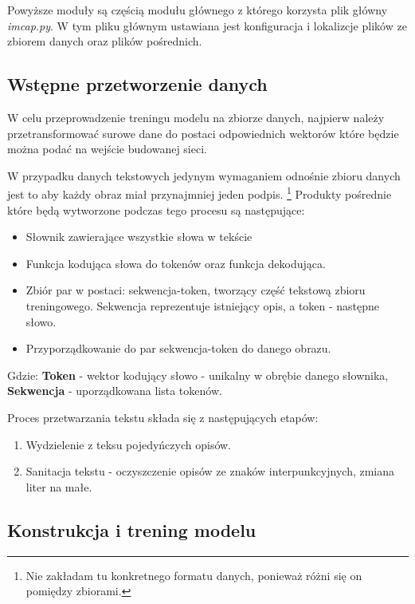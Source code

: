 Powyższe moduły są częścią modułu głównego z którego korzysta plik główny \textit{imcap.py}. W tym pliku głównym ustawiana jest konfiguracja i lokalizcje plików ze zbiorem danych oraz plików pośrednich.
\subsection{Wstępne przetworzenie danych}
W celu przeprowadzenie treningu modelu na zbiorze danych, najpierw należy przetransformować surowe dane do postaci odpowiednich wektorów które będzie można podać na wejście budowanej sieci.

W przypadku danych tekstowych jedynym wymaganiem odnośnie zbioru danych jest to aby każdy obraz miał przynajmniej jeden podpis.
\footnote{Nie zakładam tu konkretnego formatu danych, ponieważ różni się on pomiędzy zbiorami.} Produkty pośrednie które będą wytworzone podczas tego procesu są następujące:
\begin{itemize}
  \item Słownik zawierające wszystkie słowa w tekście
  \item Funkcja kodująca słowa do tokenów oraz funkcja dekodująca.
  \item Zbiór par w postaci: sekwencja-token, tworzący część tekstową zbioru treningowego. Sekwencja reprezentuje istniejący opis, a token - następne słowo.
  \item Przyporządkowanie do par sekwencja-token do danego obrazu.
\end{itemize} 
Gdzie: \textbf{Token} - wektor kodujący słowo - unikalny w obrębie danego słownika,
\textbf{Sekwencja} - uporządkowana lista tokenów.

Proces przetwarzania tekstu składa się z następujących etapów:
\begin{enumerate}
	\item Wydzielenie z teksu pojedyńczych opisów.
	\item Sanitacja tekstu - oczyszczenie opisów ze znaków interpunkcyjnych, zmiana liter na małe.
	 
\end{enumerate}

\subsection{Konstrukcja i trening modelu}
